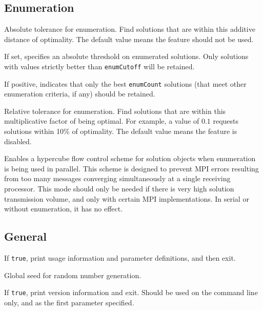 \subsection{Enumeration}
\vspace{-3ex}
Absolute tolerance for enumeration.  Find solutions
that are within this additive distance of optimality.  The default
value means the feature should not be used.

If set, specifies an absolute threshold on enumerated solutions.  Only
solutions with values strictly better than \texttt{enumCutoff} will be
retained. 

        If positive, indicates that only the best \texttt{enumCount}
        solutions (that meet other enumeration criteria, if any)
        should be retained. 

        Relative tolerance for enumeration.  Find solutions
        that are within this multiplicative factor of being
        optimal.  For example, a value of $0.1$ requests solutions
        within 10\% of optimality.  The default value means the
        feature is disabled.

Enables a hypercube flow control scheme for solution objects when enumeration
is being used in parallel.  This scheme is designed to prevent MPI errors
resulting from too many messages converging simultaneously at a single
receiving processor.  This mode should only be needed if there is very high
solution transmission volume, and only with certain MPI implementations.  In
serial or without enumeration, it has no effect.


\subsection{General}
\vspace{-3ex}
If \texttt{true}, print usage information and parameter definitions, and then exit.

Global seed for random number generation.

If \texttt{true}, print version information and exit. Should be used  on
the command line only, and as the first parameter specified.


